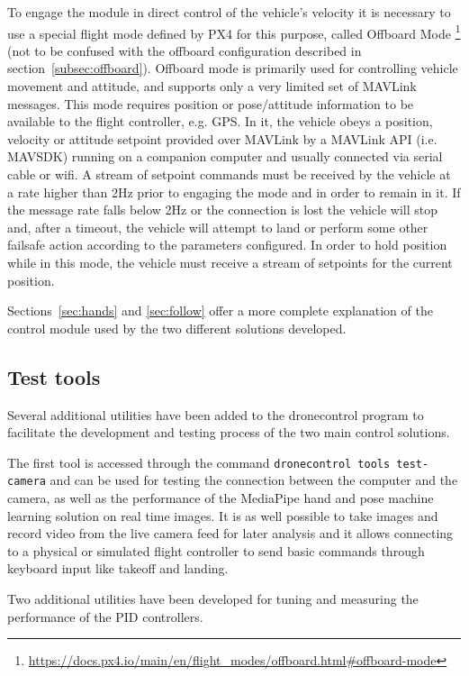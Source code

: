 To engage the module in direct control of the vehicle's velocity it is necessary to use a special flight mode defined by PX4 for this purpose, called Offboard Mode \footnote{\url{https://docs.px4.io/main/en/flight_modes/offboard.html\#offboard-mode}} (not to be confused with the offboard configuration described in section~\ref{subsec:offboard}).
Offboard mode is primarily used for controlling vehicle movement and attitude, and supports only a very limited set of MAVLink messages. This mode requires position or pose/attitude information to be available to the flight controller, e.g. GPS.
In it, the vehicle obeys a position, velocity or attitude setpoint provided over MAVLink by a MAVLink API (i.e. MAVSDK) running on a companion computer and usually connected via serial cable or wifi.
A stream of setpoint commands must be received by the vehicle at a rate higher than 2Hz prior to engaging the mode and in order to remain in it.
If the message rate falls below 2Hz or the connection is lost the vehicle will stop and, after a timeout, the vehicle will attempt to land or perform some other failsafe action according to the parameters configured.
In order to hold position while in this mode, the vehicle must receive a stream of setpoints for the current position.

Sections~\ref{sec:hands} and \ref{sec:follow} offer a more complete explanation of the control module used by the two different solutions developed.


\subsection{Test tools}
\label{subsec:test-tools}

Several additional utilities have been added to the dronecontrol program to facilitate the development and testing process of the two main control solutions.

The first tool is accessed through the command \texttt{dronecontrol tools test-camera} and can be used for testing the connection between the computer and the camera, as well as the performance of the MediaPipe hand and pose machine learning solution on real time images.
It is as well possible to take images and record video from the live camera feed for later analysis and it allows connecting to a physical or simulated flight controller to send basic commands through keyboard input like takeoff and landing.


Two additional utilities have been developed for tuning and measuring the performance of the PID controllers.


